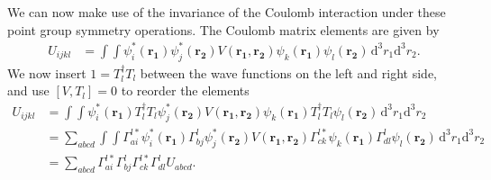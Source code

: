 \documentclass[12pt,a4paper]{scrartcl}
\numberwithin{equation}{section}
\renewcommand{\vec}{\mathbf}
\begin{document}
We can now make use of the invariance of the Coulomb interaction under these point group symmetry operations.
The Coulomb matrix elements are given by
\begin{align}
 U_{ijkl}
 &= \int\int \psi^*_i(\vec{r_1}) \psi^*_j(\vec{r_2}) V(\vec{r_1},\vec{r_2}) \psi_k(\vec{r_1}) \psi_l(\vec{r_2}) \, \mathrm{d}^3r_1 \mathrm{d}^3r_2.
\end{align}
We now insert $1=T_l^{\dagger} T_l$ between the wave functions on the left and right side,
and use $[V,T_l]=0$ to reorder the elements
\begin{align}
 U_{ijkl}
 &= \int\int \psi^*_i(\vec{r_1}) T_l^{\dagger} T_l \psi^*_j(\vec{r_2}) 
 V(\vec{r_1},\vec{r_2}) 
 \psi_k(\vec{r_1}) T_l^{\dagger} T_l \psi_l(\vec{r_2}) \, \mathrm{d}^3r_1 \mathrm{d}^3r_2 \\
 &= \sum_{abcd} \int\int \Gamma^{l*}_{ai} \psi^*_i(\vec{r_1}) \Gamma^{l}_{bj} \psi^*_j(\vec{r_2}) 
 V(\vec{r_1},\vec{r_2}) 
 \Gamma^{l*}_{ck} \psi_k(\vec{r_1}) \Gamma^{l}_{dl} \psi_l(\vec{r_2}) \, \mathrm{d}^3r_1 \mathrm{d}^3r_2 \\
 &= \sum_{abcd}\Gamma^{l*}_{ai}\Gamma^{l}_{bj}  \Gamma^{l*}_{ck} \Gamma^{l}_{dl} U_{abcd} .
\end{align}




\clearpage

\end{document}
